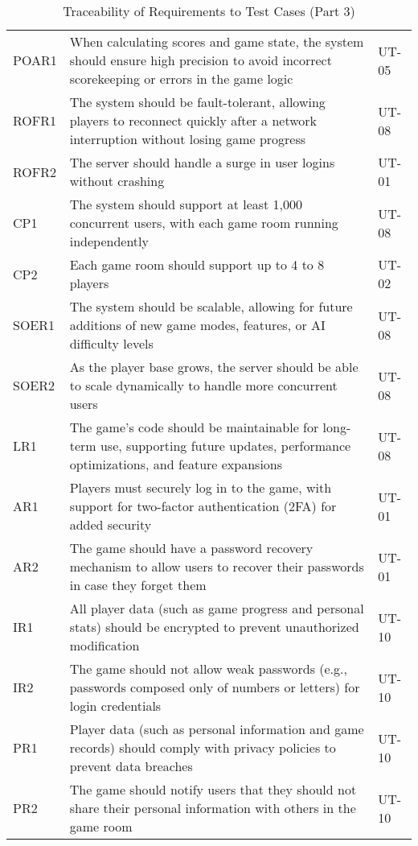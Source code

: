 \documentclass[12pt, titlepage]{article}
\begin{document}
\begin{table}[H]
    \centering
    \begin{tabularx}{\textwidth}{|l|X|l|}
        \hline
        POAR1 & When calculating scores and game state, the system should ensure high precision to avoid incorrect scorekeeping or errors in the game logic & UT-05 \\
        ROFR1 & The system should be fault-tolerant, allowing players to reconnect quickly after a network interruption without losing game progress & UT-08 \\
        ROFR2 & The server should handle a surge in user logins without crashing & UT-01 \\
        CP1 & The system should support at least 1,000 concurrent users, with each game room running independently & UT-08 \\
        CP2 & Each game room should support up to 4 to 8 players & UT-02 \\
        SOER1 & The system should be scalable, allowing for future additions of new game modes, features, or AI difficulty levels & UT-08 \\
        SOER2 & As the player base grows, the server should be able to scale dynamically to handle more concurrent users & UT-08 \\
        LR1 & The game’s code should be maintainable for long-term use, supporting future updates, performance optimizations, and feature expansions & UT-08 \\
        AR1 & Players must securely log in to the game, with support for two-factor authentication (2FA) for added security & UT-01 \\
        AR2 & The game should have a password recovery mechanism to allow users to recover their passwords in case they forget them & UT-01 \\
        IR1 & All player data (such as game progress and personal stats) should be encrypted to prevent unauthorized modification & UT-10 \\
        IR2 & The game should not allow weak passwords (e.g., passwords composed only of numbers or letters) for login credentials & UT-10 \\
        PR1 & Player data (such as personal information and game records) should comply with privacy policies to prevent data breaches & UT-10 \\
        PR2 & The game should notify users that they should not share their personal information with others in the game room & UT-10 \\
        \hline
    \end{tabularx}
    \caption{Traceability of Requirements to Test Cases (Part 3)}
    \label{tab:trace_requirements_3}
\end{table}
\end{document}
